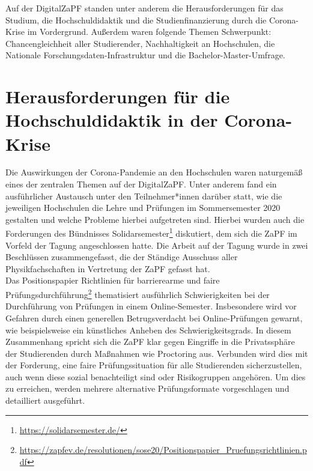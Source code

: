 \documentclass{scrartcl}
\begin{document}
Auf der DigitalZaPF standen unter anderem die Herausforderungen für das Studium, die Hochschuldidaktik und die Studienfinanzierung durch die Corona-Krise im Vordergrund. Außerdem waren folgende Themen Schwerpunkt: Chancengleichheit aller Studierender, Nachhaltigkeit an Hochschulen, die Nationale Forschungsdaten-Infrastruktur und die Bachelor-Master-Umfrage.

\section*{Herausforderungen für die Hochschuldidaktik in der Corona-Krise} 
Die Auswirkungen der Corona-Pandemie an den Hochschulen waren naturgemäß eines der zentralen Themen auf der DigitalZaPF. Unter anderem fand ein ausführlicher Austausch unter den Teilnehmer*innen darüber statt, wie die jeweiligen Hochschulen die Lehre und Prüfungen im Sommersemester 2020 gestalten und welche Probleme hierbei aufgetreten sind. Hierbei wurden auch die Forderungen des Bündnisses Solidarsemester\footnote{\href{https://solidarsemester.de/}{https://solidarsemester.de/}} diskutiert, dem sich die ZaPF im Vorfeld der Tagung angeschlossen hatte. Die Arbeit auf der Tagung wurde in zwei Beschlüssen zusammengefasst, die der Ständige Ausschuss aller Physikfachschaften in Vertretung der ZaPF gefasst hat.\\

Das Positionspapier \glqq Richtlinien für barrierearme und faire Prüfungsdurchführung\grqq\footnote{\href{https://zapfev.de/resolutionen/sose20/Positionspapier_Pruefungsrichtlinien.pdf}{https://zapfev.de/resolutionen/sose20/Positionspapier\_Pruefungsrichtlinien.pdf}} thematisiert ausführlich Schwierigkeiten bei der Durchführung von Prüfungen in einem Online-Semester. Insbesondere wird vor Gefahren durch einen generellen Betrugsverdacht bei Online-Prüfungen gewarnt, wie beispielsweise ein künstliches Anheben des Schwierigkeitsgrads. In diesem Zusammenhang spricht sich die ZaPF klar gegen Eingriffe in die Privatssphäre der Studierenden durch Maßnahmen wie Proctoring aus. Verbunden wird dies mit der Forderung, eine faire Prüfungssituation für alle Studierenden sicherzustellen, auch wenn diese sozial benachteiligt sind oder Risikogruppen angehören. Um dies zu erreichen, werden mehrere alternative Prüfungsformate vorgeschlagen und detailliert ausgeführt.\\
\end{document}
